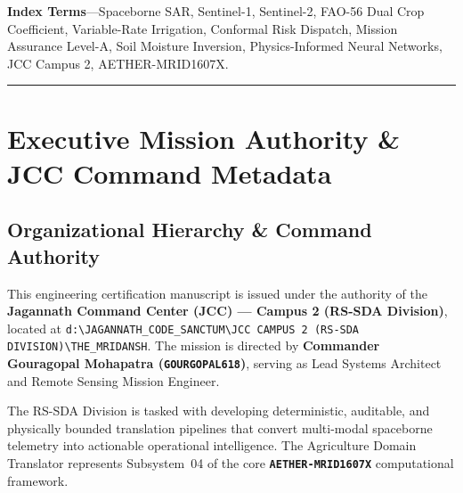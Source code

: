 \documentclass[11pt,a4paper]{article}
\theoremstyle{definition}
\theoremstyle{remark}
\begin{document}
\noindent \textbf{\small Index Terms}---Spaceborne SAR, Sentinel-1, Sentinel-2, FAO-56 Dual Crop Coefficient, Variable-Rate Irrigation, Conformal Risk Dispatch, Mission Assurance Level-A, Soil Moisture Inversion, Physics-Informed Neural Networks, JCC Campus 2, AETHER-MRID1607X.

\vspace{0.4cm}
\hrule
\vspace{0.6cm}


\section{Executive Mission Authority \& JCC Command Metadata}

\subsection{Organizational Hierarchy \& Command Authority}
This engineering certification manuscript is issued under the authority of the \textbf{Jagannath Command Center (JCC) --- Campus 2 (RS-SDA Division)}, located at \texttt{d:\textbackslash JAGANNATH\_CODE\_SANCTUM\textbackslash JCC CAMPUS 2 (RS-SDA DIVISION)\textbackslash THE\_MRIDANSH}. The mission is directed by \textbf{Commander Gouragopal Mohapatra (\texttt{GOURGOPAL618})}, serving as Lead Systems Architect and Remote Sensing Mission Engineer. 

The RS-SDA Division is tasked with developing deterministic, auditable, and physically bounded translation pipelines that convert multi-modal spaceborne telemetry into actionable operational intelligence. The Agriculture Domain Translator represents Subsystem~04 of the core \textbf{\texttt{AETHER-MRID1607X}} computational framework.
\end{document}
